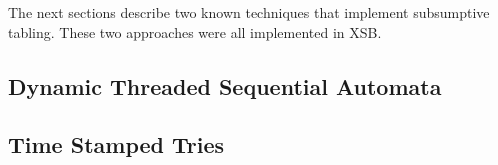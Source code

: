 The next sections describe two known techniques that implement subsumptive tabling. These two approaches were all implemented in XSB.

  \subsection{Dynamic Threaded Sequential Automata}
  \subsection{Time Stamped Tries} \label{sec:time_stamped_tries}
